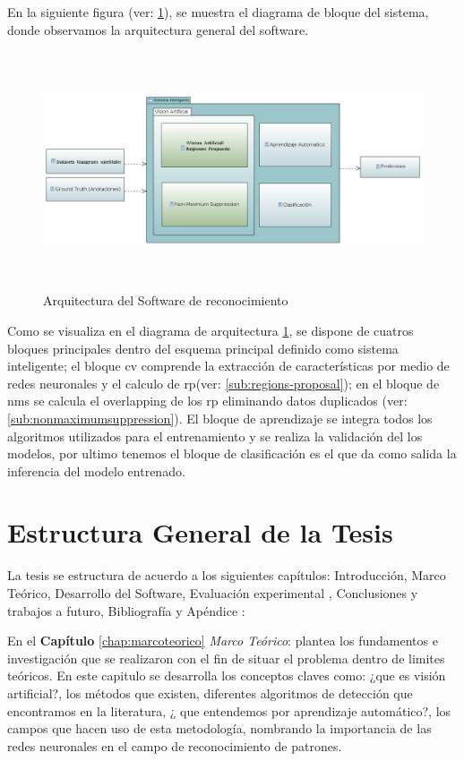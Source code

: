 En la siguiente figura (ver: \ref{Fig: diagbloque}), se muestra el diagrama de bloque del sistema, donde observamos la arquitectura general del software. 

\begin{figure}[H]
 \centering
  \includegraphics[height=7cm,keepaspectratio=true,clip=true]{imagenes/Logos/diagramabloque.png}
  \caption{Arquitectura del Software de reconocimiento}
	\label{Fig: diagbloque}
 \end{figure}
 
Como se visualiza en el diagrama de arquitectura \ref{Fig: diagbloque}, se dispone de cuatros bloques principales dentro del esquema principal definido como sistema inteligente; el bloque \ac{cv} comprende la extracción de características por medio de redes neuronales y el calculo de \ac{rp}(ver: \ref{sub:regions-proposal}); en el bloque de \ac{nms} se calcula el overlapping de los \ac{rp} eliminando datos duplicados (ver: \ref{sub:nonmaximumsuppression}). El bloque de aprendizaje se integra todos los algoritmos utilizados para el entrenamiento y se realiza la validación del los modelos, por ultimo tenemos el bloque de clasificación es el que da como salida la inferencia del modelo entrenado.


\section{Estructura General de la Tesis }\label{sec:estructura}


La tesis se estructura de acuerdo a los siguientes capítulos: Introducción, Marco Teórico, Desarrollo del Software, Evaluación experimental , Conclusiones y trabajos a futuro, Bibliografía y Apéndice :

En el \textbf{Capítulo} \ref{chap:marcoteorico} \textit{Marco Teórico}: plantea los fundamentos e investigación que se realizaron con el fin de situar el problema dentro de limites teóricos. En este capitulo se desarrolla los conceptos claves como: ¿que es visión artificial?, los métodos que existen, diferentes algoritmos de detección que encontramos en la literatura, ¿ que entendemos por aprendizaje automático?, los campos que hacen uso de esta metodología, nombrando la importancia de las redes neuronales en el campo de reconocimiento de patrones.

